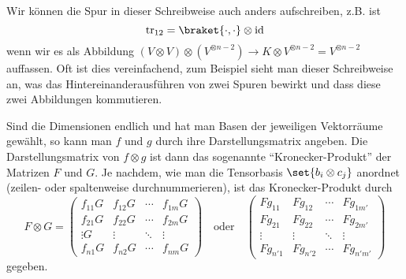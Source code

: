 \begin{example}
Wir können die Spur in dieser Schreibweise auch anders aufschreiben, z.B. ist
\[\tr_{12} = \braket{\cdot,\cdot} \otimes \id\]
wenn wir es als Abbildung $(V\otimes V)\otimes(V^{\otimes n-2}) \to K \otimes V^{\otimes n-2} = V^{\otimes n-2}$ auffassen. Oft ist dies vereinfachend, zum Beispiel sieht man dieser Schreibweise an, was das Hintereinanderausführen von zwei Spuren bewirkt und dass diese zwei Abbildungen kommutieren.
\end{example}

\begin{remark}
Sind die Dimensionen endlich und hat man Basen der jeweiligen Vektorräume gewählt, so kann man $f$ und $g$ durch ihre Darstellungsmatrix angeben. Die Darstellungsmatrix von $f\otimes g$ ist dann das sogenannte \enquote{Kronecker-Produkt} der Matrizen $F$ und $G$. Je nachdem, wie man die Tensorbasis $\set{b_i\otimes c_j}$ anordnet (zeilen- oder spaltenweise durchnummerieren), ist das Kronecker-Produkt durch
\[F\otimes G = \begin{pmatrix}
f_{11} G & f_{12} G & \cdots & f_{1m} G \\
f_{21} G & f_{22} G & \cdots & f_{2m} G \\
\vdots G &  \vdots  & \ddots & \vdots   \\
f_{n1} G & f_{n2} G & \cdots & f_{nm} G
\end{pmatrix} \quad\text{oder}\quad \begin{pmatrix}
F g_{11} & F g_{12} & \cdots & F g_{1m'} \\
F g_{21} & F g_{22} & \cdots & F g_{2m'} \\
  \vdots &   \vdots & \ddots &   \vdots  \\
F g_{n'1} & F g_{n'2} & \cdots & F g_{n'm'}
\end{pmatrix}\]
gegeben.
\end{remark}


